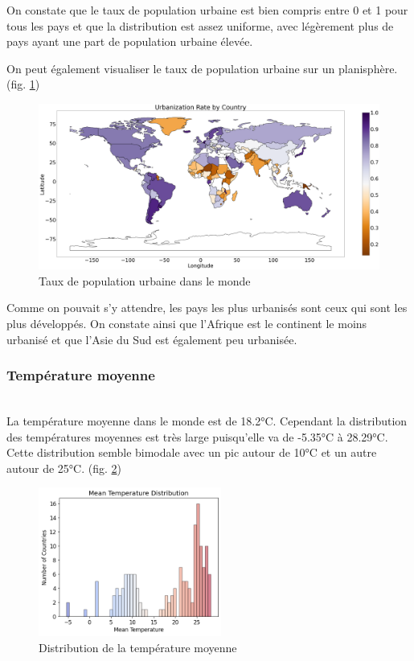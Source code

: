 \documentclass[12pt]{iEEEtran}
\begin{document}
On constate que le taux de population urbaine est bien compris entre 0 et 1 pour tous les pays
et que la distribution est assez uniforme, avec légèrement plus de pays ayant une part de population
urbaine élevée.

On peut également visualiser le taux de population urbaine sur un planisphère. (fig. \ref{fig:urb_rate_world})

\begin{figure}[h]
    \centering
    \includegraphics[width=\columnwidth]{img/urb_rate_world.png}
    \caption{Taux de population urbaine dans le monde}
    \label{fig:urb_rate_world}
\end{figure}

Comme on pouvait s'y attendre, les pays les plus urbanisés sont ceux qui sont
les plus développés. On constate ainsi que l'Afrique est le continent le moins
urbanisé et que l'Asie du Sud est également peu urbanisée.
\\

\subsubsection{Température moyenne}\hfill\\

La température moyenne dans le monde est de 18.2°C. Cependant la distribution des températures
moyennes est très large puisqu'elle va de -5.35°C à 28.29°C. Cette distribution semble
bimodale avec un pic autour de 10°C et un autre autour de 25°C. (fig. \ref{fig:temp})

\begin{figure}[h]
    \centering
    \includegraphics[width=6cm]{img/temp.png}
    \caption{Distribution de la température moyenne}
    \label{fig:temp}
\end{figure}
\end{document}
